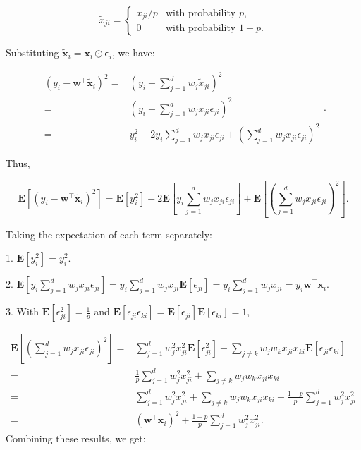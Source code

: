 \documentclass[10pt]{article}
\newcommand{\wv}{\mathbf{w}}
\newcommand{\xv}{\mathbf{x}}
\newcommand{\epsilonv}{\boldsymbol{\epsilon}}
\begin{document}
\begin{exercise}
\begin{enumerate}
		      $$
			      \tilde{x}_{ji} =
			      \begin{cases}
				      x_{ji} / p & \text{with probability } p,   \\
				      0          & \text{with probability } 1-p.
			      \end{cases}
		      $$

		      Substituting $\tilde{\xv}_i = \xv_i \odot \epsilonv_i$, we have:

		      $$
			      \begin{aligned}
				      (y_i - \wv^\top \tilde{\xv}_i)^2
				      = & \left(y_i - \sum_{j=1}^d w_j \tilde{x}_{ji}\right)^2                                                       \\
				      = & \left(y_i - \sum_{j=1}^d w_j x_{ji} \epsilon_{ji}\right)^2                                                 \\
				      = & y_i^2 - 2 y_i \sum_{j=1}^d w_j x_{ji} \epsilon_{ji} + \left(\sum_{j=1}^d w_j x_{ji} \epsilon_{ji}\right)^2
			      \end{aligned}.
		      $$

		      Thus,

		      $$
			      \mathbf{E}[(y_i - \wv^\top \tilde{\xv}_i)^2] = \mathbf{E}\left[y_i^2\right] - 2\mathbf{E}\left[y_i \sum_{j=1}^d w_j x_{ji} \epsilon_{ji}\right] + \mathbf{E}\left[\left(\sum_{j=1}^d w_j x_{ji} \epsilon_{ji}\right)^2\right].
		      $$

		      Taking the expectation of each term separately:

		      1. $\mathbf{E}[y_i^2] = y_i^2$.

		      2. $\mathbf{E}\left[y_i \sum_{j=1}^d w_j x_{ji} \epsilon_{ji}\right] = y_i \sum_{j=1}^d w_j x_{ji} \mathbf{E}[\epsilon_{ji}] = y_i \sum_{j=1}^d w_j x_{ji}=y_i\wv^\top \xv_i.$

		      3. With $\mathbf{E}[\epsilon_{ji}^2]=\frac{1}{p}$ and $\mathbf{E}[\epsilon_{ji}\epsilon_{ki}]=\mathbf{E}[\epsilon_{ji}]\mathbf{E}[\epsilon_{ki}]=1$,

		      $$
			      \begin{aligned}
				      \mathbf{E}\left[\left(\sum_{j=1}^d w_j x_{ji} \epsilon_{ji}\right)^2\right]
				      = & \sum_{j=1}^d w_j^2 x_{ji}^2 \mathbf{E}[\epsilon_{ji}^2] + \sum_{j\neq k}w_jw_kx_{ji}x_{ki}\mathbf{E}[\epsilon_{ji}\epsilon_{ki}] \\
				      = & \frac{1}{p}\sum_{j=1}^d w_j^2 x_{ji}^2 + \sum_{j\neq k}w_jw_kx_{ji}x_{ki}                                                        \\
				      = & \sum_{j=1}^d w_j^2 x_{ji}^2 + \sum_{j\neq k}w_jw_kx_{ji}x_{ki} + \frac{1-p}{p}\sum_{j=1}^d w_j^2 x_{ji}^2                        \\
				      = & (\wv^\top \xv_i)^2 + \frac{1-p}{p}\sum_{j=1}^d w_j^2 x_{ji}^2.
			      \end{aligned}
		      $$
		      \newpage
		      Combining these results, we get:


\end{enumerate}
\end{exercise}
\end{document}
